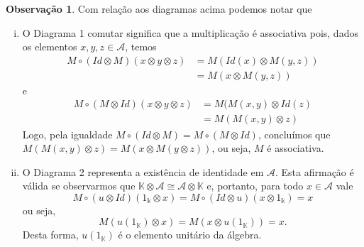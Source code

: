 \documentclass[twoside,openright,titlepage,numbers=noenddot,headinclude,  lineheaders footinclude=true,cleardoublepage=empty,
                                BCOR=5mm,paper=a4,fontsize=12pt ]{scrbook}
\theoremstyle{definition}
\newtheorem*{obs*}{Observação}
\begin{document}
\begin{obs*}
Com relação aos diagramas acima podemos notar que

\begin{enumerate}[(i)]
    \item O Diagrama 1 comutar significa que a multiplicação é associativa pois, dados os elementos
    $x, y, z \in \mathcal{A}$, temos
    \begin{align*}
        M \circ ( Id \otimes M)(x \otimes y \otimes z) & = M( Id(x) \otimes M(y, z)) \\
                                                       & = M(x \otimes M(y, z))
    \end{align*}
    e
    \begin{align*}
        M \circ ( M \otimes Id)(x \otimes y \otimes z) & = M( M(x, y) \otimes Id(z)\\
                                                       & = M( M(x, y) \otimes z)
    \end{align*}
    Logo, pela igualdade $M \circ (Id \otimes M) = M \circ (M \otimes Id)$, concluímos que
    $M( M(x, y) \otimes z) = M( x \otimes M( y \otimes z))$, ou seja, $M$ é associativa.
    \item O Diagrama 2 representa a existência de identidade em $\mathcal{A}$. Esta afirmação é válida
    se observarmos que $\mathbb{K} \otimes \mathcal{A} \cong \mathcal{A} \otimes \mathbb{K}$ e, portanto, 
    para todo $x \in \mathcal{A}$ vale
    \[ M \circ (u \otimes Id)(1_{\mathbb{k}} \otimes x) =  M \circ (Id \otimes u)(x \otimes 1_{\mathbb{k}} ) = x\]
    ou seja,
    \[ M(u(1_{\mathbb{K}}) \otimes x) = M(x \otimes u(1_{\mathbb{K}})) = x.\]
    Desta forma, $u(1_{\mathbb{K}})$ é o  elemento unitário da álgebra.
\end{enumerate}
\end{obs*}
\end{document}
